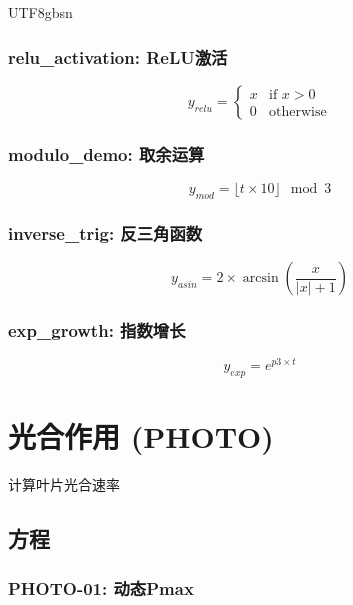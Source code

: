 \documentclass{article}
\begin{document}
\begin{CJK}{UTF8}{gbsn}
\subsubsection{relu_activation: ReLU激活}

\begin{equation}
    y_{relu} = \begin{cases} x & \text{if } x > 0 \\ 0 & \text{otherwise} \end{cases}
\end{equation}

\subsubsection{modulo_demo: 取余运算}

\begin{equation}
    y_{mod} = \lfloor t \times 10 \rfloor \mod 3
\end{equation}

\subsubsection{inverse_trig: 反三角函数}

\begin{equation}
    y_{asin} = 2 \times \arcsin(\frac{x}{|x| + 1})
\end{equation}

\subsubsection{exp_growth: 指数增长}

\begin{equation}
    y_{exp} = e^{p3 \times t}
\end{equation}

\section{光合作用 (PHOTO)}

计算叶片光合速率

\subsection{方程}

\subsubsection{PHOTO-01: 动态Pmax}


\end{CJK}
\end{document}
